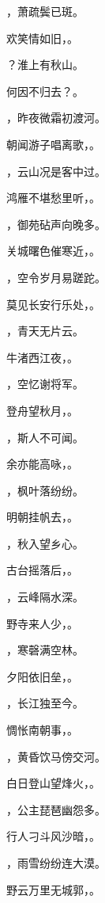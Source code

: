 \documentclass[12pt, a4paper, addpoints, answers]{exam}
\begin{document}
\begin{questions}
\question[3] \fillin，萧疏鬓已斑。

\question[3] 欢笑情如旧，\fillin。

\question[3] \fillin？淮上有秋山。

\question[3] 何因不归去？\fillin。

\question[3] \fillin，昨夜微霜初渡河。

\question[3] 朝闻游子唱离歌，\fillin。

\question[3] \fillin，云山况是客中过。

\question[3] 鸿雁不堪愁里听，\fillin。

\question[3] \fillin，御苑砧声向晚多。

\question[3] 关城曙色催寒近，\fillin。

\question[3] \fillin，空令岁月易蹉跎。

\question[3] 莫见长安行乐处，\fillin。

\question[3] \fillin，青天无片云。

\question[3] 牛渚西江夜，\fillin。

\question[3] \fillin，空忆谢将军。

\question[3] 登舟望秋月，\fillin。

\question[3] \fillin，斯人不可闻。

\question[3] 余亦能高咏，\fillin。

\question[3] \fillin，枫叶落纷纷。

\question[3] 明朝挂帆去，\fillin。

\question[3] \fillin，秋入望乡心。

\question[3] 古台摇落后，\fillin。

\question[3] \fillin，云峰隔水深。

\question[3] 野寺来人少，\fillin。

\question[3] \fillin，寒磬满空林。

\question[3] 夕阳依旧垒，\fillin。

\question[3] \fillin，长江独至今。

\question[3] 惆怅南朝事，\fillin。

\question[3] \fillin，黄昏饮马傍交河。

\question[3] 白日登山望烽火，\fillin。

\question[3] \fillin，公主琵琶幽怨多。

\question[3] 行人刁斗风沙暗，\fillin。

\question[3] \fillin，雨雪纷纷连大漠。

\question[3] 野云万里无城郭，\fillin。


\end{questions}
\end{document}
